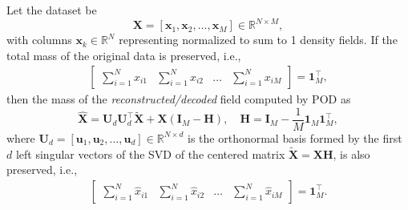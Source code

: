 \documentclass[10pt,a4paper]{amsart}
\begin{document}
\begin{prop}
\label{prop1}
Let the dataset be 
\begin{equation}
    \mathbf{X} = [\mathbf{x}_1, \mathbf{x}_2, \dots, \mathbf{x}_M] \in \mathbb{R}^{N \times M},
\end{equation}
with columns $\mathbf{x}_k \in \mathbb{R}^{N}$ representing normalized to sum to 1 density fields. If the total mass of the original data is preserved, i.e.,
\begin{align}
    \begin{bmatrix}
      \sum_{i=1}^{N} x_{i1} & \sum_{i=1}^{N} x_{i2} & \dots & \sum_{i=1}^{N} x_{iM}
    \end{bmatrix}
    = \mathbf{1}_M^\top,
\end{align}
then the mass of the \textit{reconstructed/decoded} field computed by POD as
\begin{equation}
\hat{\mathbf{X}} = \mathbf{U}_d 
\mathbf{U}_d^\top \tilde{\mathbf{X}} +  \mathbf{X} (\mathbf{I}_M - \mathbf{H}), \quad \mathbf{H} = \mathbf{I}_M - \frac{1}{M} \mathbf{1}_M \mathbf{1}_M^\top,
\label{eq:recon_theorem}
\end{equation}
where $\mathbf{U}_d = [\mathbf{u}_1,\mathbf{u}_2,\dots, \mathbf{u}_d] \in \mathbb{R}^{N \times d}$ is the orthonormal basis formed by the first $d$ left singular vectors of the SVD of the centered matrix $\tilde{\mathbf{X}} = \mathbf{X} \mathbf{H}$, is also preserved, i.e.,
\begin{align}
    \begin{bmatrix}
      \sum_{i=1}^{N} \hat{x}_{i1} & \sum_{i=1}^{N} \hat{x}_{i2} & \dots & \sum_{i=1}^{N} \hat{x}_{iM}
    \end{bmatrix}
    = \mathbf{1}_M^\top.
\end{align}
\end{prop}
\end{document}
